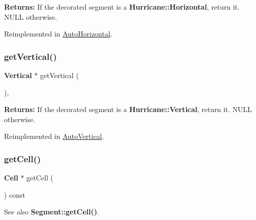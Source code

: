 {\bfseries Returns\+:} If the decorated segment is a \textbf{ Hurricane\+::\+Horizontal}, return it. {\ttfamily N\+U\+LL} otherwise. 

Reimplemented in \mbox{\hyperlink{classKatabatic_1_1AutoHorizontal_a659b8ed90de679564924afe07af478de}{Auto\+Horizontal}}.

\mbox{\label{classKatabatic_1_1AutoSegment_ab6a809b6f3ef3cf5385fa35580e31e7a}} 
\subsubsection{\texorpdfstring{get\+Vertical()}{getVertical()}}
{\footnotesize\ttfamily \textbf{ Vertical} $\ast$ get\+Vertical (\begin{DoxyParamCaption}{ }\end{DoxyParamCaption})\hspace{0.3cm}{\ttfamily [inline]}, {\ttfamily [virtual]}}

{\bfseries Returns\+:} If the decorated segment is a \textbf{ Hurricane\+::\+Vertical}, return it. {\ttfamily N\+U\+LL} otherwise. 

Reimplemented in \mbox{\hyperlink{classKatabatic_1_1AutoVertical_ab6a809b6f3ef3cf5385fa35580e31e7a}{Auto\+Vertical}}.

\mbox{\label{classKatabatic_1_1AutoSegment_a55a3a88610ef1af9931e634f77f2403b}} 
\subsubsection{\texorpdfstring{get\+Cell()}{getCell()}}
{\footnotesize\ttfamily \textbf{ Cell} $\ast$ get\+Cell (\begin{DoxyParamCaption}{ }\end{DoxyParamCaption}) const\hspace{0.3cm}{\ttfamily [inline]}}

\begin{DoxySeeAlso}{See also}
\textbf{ Segment\+::get\+Cell()}. 
\end{DoxySeeAlso}


